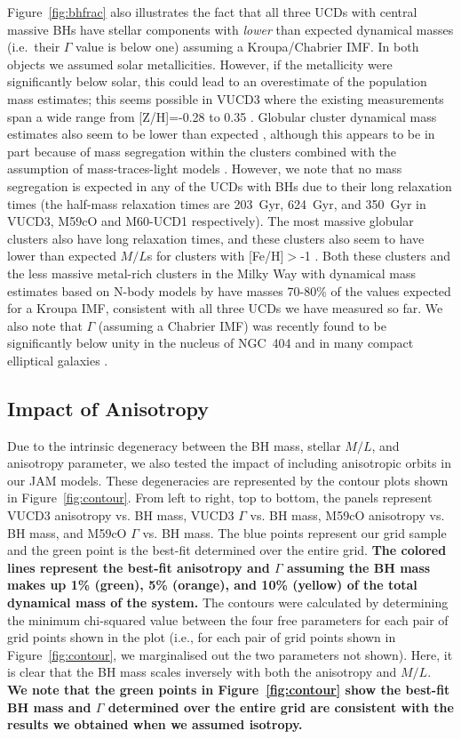 \documentclass{aastex}
\begin{document}
Figure~\ref{fig:bhfrac} also illustrates the fact that all three UCDs with central massive BHs have stellar components with {\em lower} than expected dynamical masses (i.e.~their $\Gamma$ value is below one) assuming a Kroupa/Chabrier IMF.  In both objects we assumed solar metallicities. However, if the metallicity were significantly below solar, this could lead to an overestimate of the population mass estimates; this seems possible in VUCD3 where the existing measurements span a wide range from [Z/H]=-0.28 to 0.35 \citep{evstigneeva07,firth09,francis12}.  Globular cluster dynamical mass estimates also seem to be lower than expected \citep{strader11,kimmig15}, although this appears to be in part because of mass segregation within the clusters combined with the assumption of mass-traces-light models \citep{shanahan15,baumgardt17}.  However, we note that no mass segregation is expected in any of the UCDs with BHs due to their long relaxation times (the half-mass relaxation times are 203~Gyr, 624~Gyr, and 350~Gyr in VUCD3, M59cO and M60-UCD1 respectively).  The most massive globular clusters also have long relaxation times, and these clusters also seem to have lower than expected $M/L$s for clusters with [Fe/H]$>$-1 \citep{strader11}.  Both these clusters and the less massive metal-rich clusters in the Milky Way with dynamical mass estimates based on N-body models by \citet{baumgardt17} have masses 70-80\% of the values expected for a Kroupa IMF, consistent with all three UCDs we have measured so far.  We also note that $\Gamma$ (assuming a Chabrier IMF) was recently found to be significantly below unity in the nucleus of NGC~404\citep{nguyen16} and in many compact elliptical galaxies \citep{forbes14}.  


\subsection{Impact of Anisotropy} \label{sec:anisotropy}

Due to the intrinsic degeneracy between the BH mass, stellar $M/L$, and anisotropy parameter, we also tested the impact of including anisotropic orbits in our JAM models. These degeneracies are represented by the contour plots shown in Figure~\ref{fig:contour}. From left to right, top to bottom, the panels represent VUCD3 anisotropy vs. BH mass, VUCD3 $\Gamma$ vs. BH mass, M59cO anisotropy vs. BH mass, and M59cO $\Gamma$ vs. BH mass. The blue points represent our grid sample and the green point is the best-fit determined over the entire grid. \textbf{The colored lines represent the best-fit anisotropy and $\Gamma$ assuming the BH mass makes up 1\% (green), 5\% (orange), and 10\% (yellow) of the total dynamical mass of the system.} The contours were calculated by determining the minimum chi-squared value between the four free parameters for each pair of grid points shown in the plot (i.e., for each pair of grid points shown in Figure~\ref{fig:contour}, we marginalised out the two parameters not shown). Here, it is clear that the BH mass scales inversely with both the anisotropy and $M/L$. \textbf{We note that the green points in Figure~\ref{fig:contour} show the best-fit BH mass and $\Gamma$ determined over the entire grid are consistent with the results we obtained when we assumed isotropy.}
\end{document}
